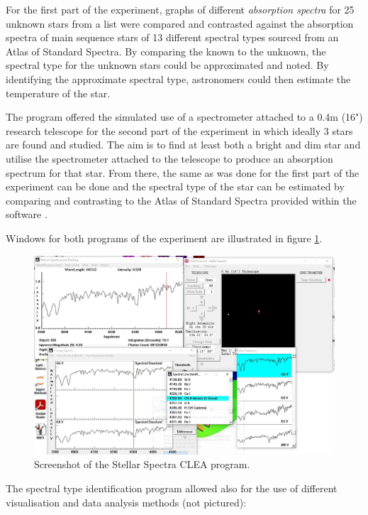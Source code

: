 \documentclass[12pt]{article}
\begin{document}
For the first part of the experiment, graphs of different \textit{absorption spectra} for 25 unknown stars from a list were compared and contrasted against the absorption spectra of main sequence stars of 13 different
spectral types sourced from an Atlas of Standard Spectra. By comparing the known to the unknown, the spectral type for the unknown stars could be approximated and noted. By identifying the approximate
spectral type, astronomers could then estimate the temperature of the star.

The program offered the simulated use of a spectrometer attached to a 0.4m (16") research telescope for the second part of the experiment in which ideally 3 stars are found and studied.
The aim is to find at least both a bright and dim star and utilise the spectrometer attached to the telescope to produce an absorption spectrum for that star. From there, the same as was done for the 
first part of the experiment can be done and the spectral type of the star can be estimated by comparing and contrasting to the Atlas of Standard Spectra provided within the software \cite{UCDspectra}.

Windows for both programs of the experiment are illustrated in figure \ref{fig:program}.

\begin{figure}[H]
    \centering
    \includegraphics[width=\textwidth]{SPECTRAPIC.JPG}
    \caption{\centering Screenshot of the Stellar Spectra CLEA program.}
    \label{fig:program}
\end{figure}

The spectral type identification program allowed also for the use of different visualisation and data analysis methods (not pictured):
\end{document}
